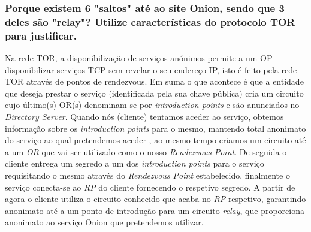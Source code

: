 \documentclass{report}
\begin{document}
\subsubsection*{Porque existem 6 "saltos" até ao site Onion, sendo que 3 deles são "relay"? Utilize características do protocolo TOR para justificar.}
Na rede TOR, a disponibilização de serviços anónimos permite a um OP disponibilizar serviços TCP sem revelar o seu endereço IP, isto é feito pela rede TOR através de pontos de rendezvous. Em suma o que acontece é que a entidade que deseja prestar o serviço (identificada pela sua chave pública) cria um circuito cujo último(s) OR(s) denominam-se por \textit{introduction points} e são anunciados no \textit{Directory Server}. Quando nós (cliente) tentamos aceder ao serviço, obtemos informação sobre os \textit{introduction points} para o mesmo, mantendo total anonimato do serviço ao qual pretendemos aceder , ao mesmo tempo criamos um circuito até a um \textit{OR} que vai ser utilizado como o nosso \textit{Rendezvous Point}. De seguida o cliente entrega um segredo a um dos \textit{introduction points} para o serviço requisitando o mesmo através do \textit{Rendezvous Point} estabelecido, finalmente o serviço conecta-se ao \textit{RP} do cliente fornecendo o respetivo segredo. A partir de agora o cliente utiliza o circuito conhecido que acaba no \textit{RP} respetivo, garantindo anonimato até a um ponto de introdução para um circuito \textit{relay}, que proporciona anonimato ao serviço Onion que pretendemos utilizar. 
\end{document}
